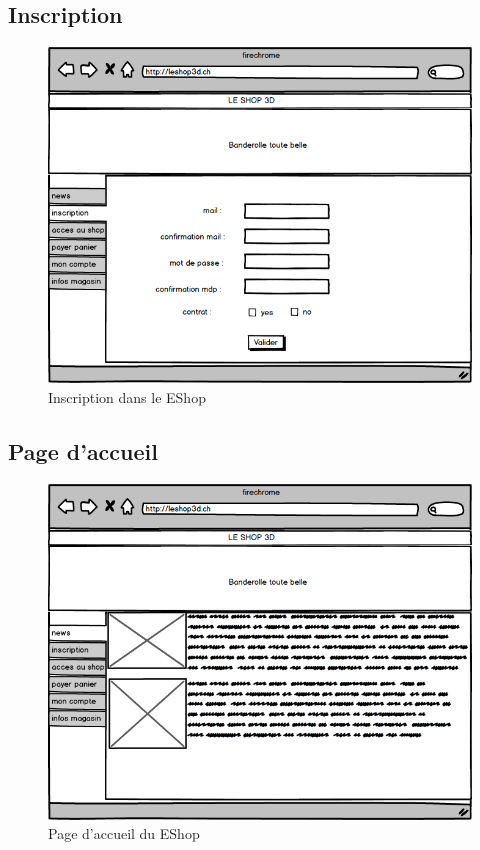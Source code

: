\documentclass[12pt]{article}
\begin{document}
\subsection{Inscription}

\begin{figure}[ht]
    \center
    \includegraphics[scale=0.6]{../Maquettes/inscription.jpeg}
    \caption*{Inscription dans le EShop}
\end{figure}

\subsection{Page d'accueil}

\begin{figure}[ht]
    \center
    \includegraphics[scale=0.6]{../Maquettes/page_accueil.jpeg}
    \caption*{Page d'accueil du EShop}
\end{figure}
\end{document}
